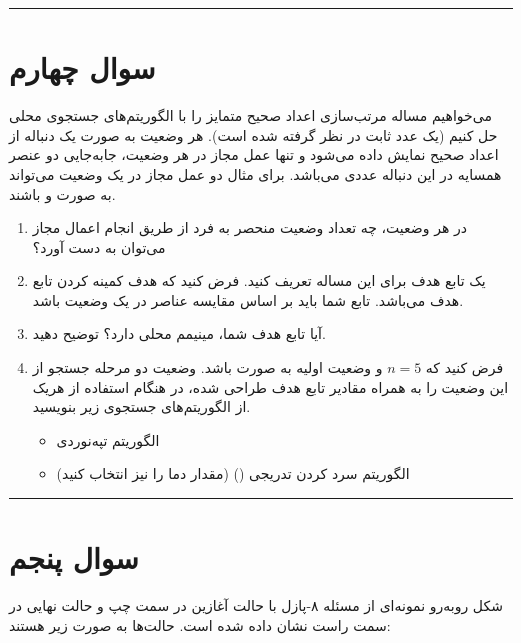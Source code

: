 \documentclass[a4paper,10pt]{article}
\begin{document}
\bigskip
\textcolor{AccentCyan}{\rule{\linewidth}{0.4pt}}

\section{\textcolor{AccentGold}{سوال چهارم}}
می‌خواهیم مساله مرتب‌سازی اعداد صحیح متمایز را با الگوریتم‌های جستجوی محلی حل کنیم (یک عدد ثابت در نظر گرفته شده است). هر وضعیت به صورت یک دنباله از اعداد صحیح نمایش داده می‌شود و تنها عمل مجاز در هر وضعیت، جابه‌جایی دو عنصر همسایه در این دنباله عددی می‌باشد. برای مثال دو عمل مجاز در یک وضعیت می‌تواند به صورت  و  باشند.

\begin{enumerate}
	\item[(الف)] در هر وضعیت، چه تعداد وضعیت منحصر به فرد از طریق انجام اعمال مجاز می‌توان به دست آورد؟
	
	\item[(ب)] یک تابع هدف برای این مساله تعریف کنید. فرض کنید که هدف کمینه کردن تابع هدف می‌باشد. تابع شما باید بر اساس مقایسه عناصر در یک وضعیت باشد.
	
	\item[(ج)] آیا تابع هدف شما، مینیمم محلی دارد؟ توضیح دهید.
	
	\item[(د)] فرض کنید که $n=5$ و وضعیت اولیه به صورت \lr{[5,1,4,2,3]} باشد. وضعیت دو مرحله جستجو از این وضعیت را به همراه مقادیر تابع هدف طراحی شده، در هنگام استفاده از هریک از الگوریتم‌های جستجوی زیر بنویسید.
	\begin{itemize}
		\item الگوریتم تپه‌نوردی
		\item الگوریتم سرد کردن تدریجی () (مقدار دما را نیز انتخاب کنید)
	\end{itemize}
	
\end{enumerate}

\bigskip
\textcolor{AccentCyan}{\rule{\linewidth}{0.4pt}}


\section{\textcolor{AccentGold}{سوال پنجم}}

شکل روبه‌رو نمونه‌ای از مسئله ۸-پازل با حالت آغازین در سمت چپ و حالت نهایی در سمت راست نشان داده شده است. حالت‌ها به صورت زیر هستند:
\end{document}

